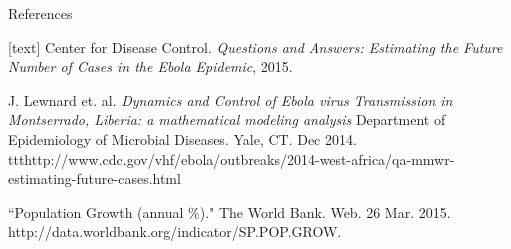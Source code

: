 \documentclass{beamer}
\begin{document}
\begin{frame}{References}

\begin{thebibliography}{3}
[text]
\tiny
{} Center for Disease Control. \emph{Questions and Answers:
Estimating the Future Number of Cases in the Ebola Epidemic}, 2015.

J. Lewnard et. al. \emph{Dynamics and Control of Ebola virus
Transmission in Montserrado, Liberia: a mathematical modeling analysis}
Department of Epidemiology of Microbial Diseases. Yale,
CT. Dec 2014.
ttt{http://www.cdc.gov/vhf/ebola/outbreaks/2014-west-africa/qa-mmwr-estimating-future-cases.html}

 ``Population Growth (annual \%)." The World Bank. Web. 26
Mar. 2015. http://data.worldbank.org/indicator/SP.POP.GROW.


\end{thebibliography}

\end{frame}
\end{document}
